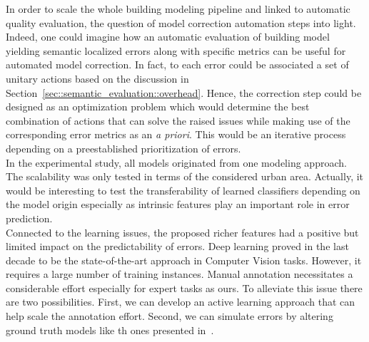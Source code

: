     In order to scale the whole building modeling pipeline and linked to automatic quality evaluation, the question of model correction automation steps into light.
    Indeed, one could imagine how an automatic evaluation of building model yielding semantic localized errors along with specific metrics can be useful for automated model correction.
    In fact, to each error could be associated a set of unitary actions based on the discussion in Section~\ref{sec::semantic_evaluation::overhead}.
    Hence, the correction step could be designed as an optimization problem which would determine the best combination of actions that can solve the raised issues while making use of the corresponding error metrics as an \textit{a priori}.
    This would be an iterative process depending on a preestablished prioritization of errors.\\
    
    In the experimental study, all models originated from one modeling approach.
    The scalability was only tested in terms of the considered urban area.
    Actually, it would be interesting to test the transferability of learned classifiers depending on the model origin especially as intrinsic features play an important role in error prediction.\\

    Connected to the learning issues, the proposed richer features had a positive but limited impact on the predictability of errors.
    Deep learning proved in the last decade to be the state-of-the-art approach in Computer Vision tasks.
    However, it requires a large number of training instances.
    Manual annotation necessitates a considerable effort especially for expert tasks as ours.
    To alleviate this issue there are two possibilities.
    First, we can develop an active learning approach that can help scale the annotation effort.
    Second, we can simulate errors by altering ground truth models like th ones presented in~\parencite{rottensteiner2012isprs}.
